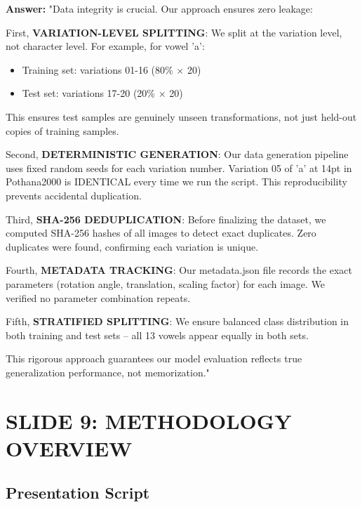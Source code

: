 \documentclass[11pt,a4paper]{article}
\begin{document}
\begin{answerbox}
\textbf{Answer:} "Data integrity is crucial. Our approach ensures zero leakage:

First, \textbf{VARIATION-LEVEL SPLITTING}: We split at the variation level, not character level. For example, for vowel 'a':
\begin{itemize}
\item Training set: variations 01-16 (80\% × 20)
\item Test set: variations 17-20 (20\% × 20)
\end{itemize}

This ensures test samples are genuinely unseen transformations, not just held-out copies of training samples.

Second, \textbf{DETERMINISTIC GENERATION}: Our data generation pipeline uses fixed random seeds for each variation number. Variation 05 of 'a' at 14pt in Pothana2000 is IDENTICAL every time we run the script. This reproducibility prevents accidental duplication.

Third, \textbf{SHA-256 DEDUPLICATION}: Before finalizing the dataset, we computed SHA-256 hashes of all images to detect exact duplicates. Zero duplicates were found, confirming each variation is unique.

Fourth, \textbf{METADATA TRACKING}: Our metadata.json file records the exact parameters (rotation angle, translation, scaling factor) for each image. We verified no parameter combination repeats.

Fifth, \textbf{STRATIFIED SPLITTING}: We ensure balanced class distribution in both training and test sets -- all 13 vowels appear equally in both sets.

This rigorous approach guarantees our model evaluation reflects true generalization performance, not memorization."
\end{answerbox}

\clearpage

\section{SLIDE 9: METHODOLOGY OVERVIEW}

\subsection{Presentation Script}
\end{document}

